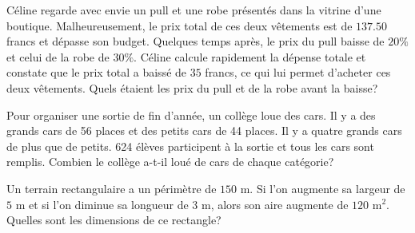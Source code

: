 \documentclass[a4paper,12pt]{report}
\begin{document}
\begin{exo}[2]
Céline regarde avec envie un pull et une robe présentés dans la vitrine d’une boutique.
Malheureusement, le prix total de ces deux vêtements est de $137.50$ francs et dépasse
son budget. Quelques temps après, le prix du pull baisse de $20\%$ et celui de la robe de $30\%$. Céline calcule rapidement la dépense totale et constate que le prix total a baissé de
$35$ francs, ce qui lui permet d’acheter ces deux vêtements.
Quels étaient les prix du pull et de la robe avant la baisse?
\end{exo}
\begin{exo}[1]
Pour organiser une sortie de fin d’année, un collège loue des cars. Il y a des grands cars de
56 places et des petits cars de 44 places. Il y a quatre grands cars de plus que de petits.
624 élèves participent à la sortie et tous les cars sont remplis.
Combien le collège a-t-il loué de cars de chaque catégorie?
\end{exo}
\begin{exo}[1]
	Un terrain rectangulaire a un périmètre de $150$ m. Si l’on augmente sa largeur de $5$ m et
si l’on diminue sa longueur de $3$ m, alors son aire augmente de $120$ $\text{m}^2$.
Quelles sont les dimensions de ce rectangle?
\end{exo}
\end{document}
